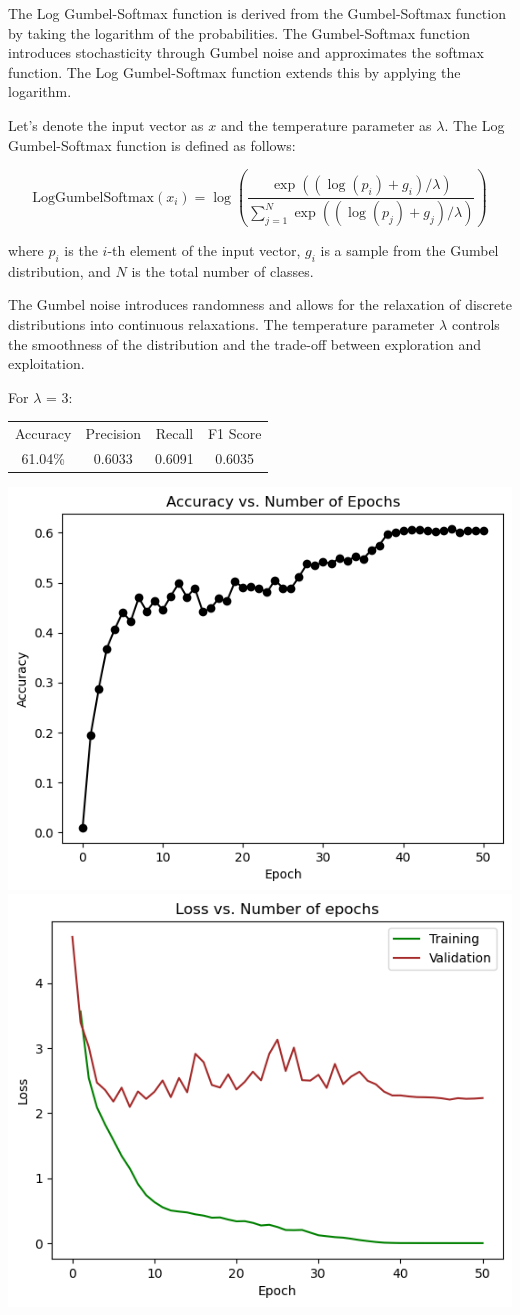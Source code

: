 \documentclass{article}
\begin{document}
The Log Gumbel-Softmax function is derived from the Gumbel-Softmax function by taking the logarithm of the probabilities. The Gumbel-Softmax function introduces stochasticity through Gumbel noise and approximates the softmax function. The Log Gumbel-Softmax function extends this by applying the logarithm.

Let's denote the input vector as \(x\) and the temperature parameter as \(\lambda\). The Log Gumbel-Softmax function is defined as follows:

\[
\text{LogGumbelSoftmax}(x_i) = \log\left(\frac{\exp((\log(p_i) + g_i)/\lambda)}{\sum_{j=1}^{N}\exp((\log(p_j) + g_j)/\lambda)}\right)
\]

where \(p_i\) is the \(i\)-th element of the input vector, \(g_i\) is a sample from the Gumbel distribution, and \(N\) is the total number of classes.

The Gumbel noise introduces randomness and allows for the relaxation of discrete distributions into continuous relaxations. The temperature parameter \(\lambda\) controls the smoothness of the distribution and the trade-off between exploration and exploitation.

\newline
For \(\lambda\) = 3:

\begin{center}
\begin{tabular}{ |c|c|c|c| } 
 \hline
 Accuracy & Precision & Recall & F1 Score \\ 
 61.04\% & 0.6033 & 0.6091 & 0.6035 \\
 \hline
\end{tabular}
\end{center}


        \includegraphics[width=0.5\linewidth]{images/LogGumbelSoftmax/log-gumbel-acc-epoch.png}
        \includegraphics[width=0.5\linewidth]{images/LogGumbelSoftmax/log-gumbel-loss-epoch.png}
\end{document}
